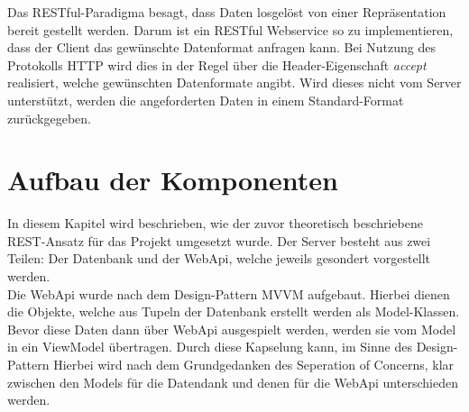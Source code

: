 Das RESTful-Paradigma besagt, dass Daten losgelöst von einer Repräsentation bereit gestellt werden. Darum ist ein RESTful Webservice so zu implementieren, dass der Client das gewünschte Datenformat anfragen kann. Bei Nutzung des Protokolls HTTP wird dies in der Regel über die Header-Eigenschaft \textit{accept} realisiert, welche gewünschten Datenformate angibt. Wird dieses nicht vom Server unterstützt, werden die angeforderten Daten in einem Standard-Format zurückgegeben. 
\section{Aufbau der Komponenten}
\label{sec:aufbau-Komponenten}
In diesem Kapitel wird beschrieben, wie der zuvor theoretisch beschriebene REST-Ansatz für das Projekt umgesetzt wurde. Der Server besteht aus zwei Teilen: Der Datenbank und der WebApi, welche jeweils gesondert vorgestellt werden.\\
Die WebApi wurde nach dem Design-Pattern \ac{MVVM} aufgebaut. Hierbei dienen die Objekte, welche aus Tupeln der Datenbank erstellt werden als Model-Klassen. Bevor diese Daten dann über WebApi ausgespielt werden, werden sie vom Model in ein ViewModel übertragen. Durch diese Kapselung kann, im Sinne des Design-Pattern Hierbei wird nach dem Grundgedanken des \ac{Seperation of Concerns}, klar zwischen den Models für die Datendank und denen für die WebApi unterschieden werden. 
